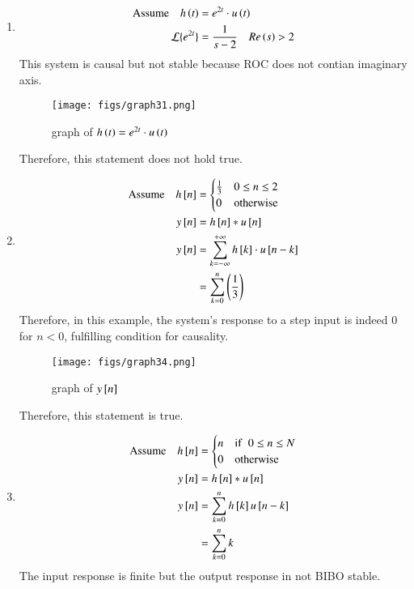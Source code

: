 \documentclass[journal,12pt,twocolumn]{IEEEtran}
\theoremstyle{remark}
\begin{document}
\begin{enumerate}
    \item
    \begin{align}
        \text{Assume}\quad h\left(t\right)&=e^{2t}\cdot u\left(t\right)\\
        \mathcal{L}\{e^{2t}\} &= \frac{1}{s-2}\quad Re\left(s\right)>2
    \end{align}
    This system is causal but not stable because ROC does not contian imaginary axis.
    
    \begin{figure}[ht]
    \renewcommand\thefigure{1}
        \centering
        \texttt{[image: figs/graph31.png]}
        \caption{graph of $h\left(t\right) = e^{2t}\cdot u\left(t\right)$}
    \end{figure}
    Therefore, this statement does not hold true.
    \item
    \begin{align}
        \text{Assume}\quad h{}\left[n\right] &= \begin{cases} 
                \frac{1}{3} & 0\leq n \leq 2 \\
                0 & \text{otherwise}
        \end{cases}\\
        y{}\left[n\right]&=h{}\left[n\right]*u{}\left[n\right]\\
        y{}\left[n\right]&=\sum_{k=-\infty}^{+\infty}h{}\left[k\right]\cdot u{}\left[n-k\right]\\
        &=\sum_{k=0}^{n}\left(\frac{1}{3}\right)
    \end{align}
    Therefore, in this example, the system's response to a step input is indeed $0$ for $n<0$, fulfilling condition for causality.\\
    \begin{figure}[h!]
    \renewcommand\thefigure{2}
        \centering
        \texttt{[image: figs/graph34.png]}
        \caption{graph of $y{}\left[n\right]$}
    \end{figure}
    Therefore, this statement is true.
    \item
    \begin{align}
            \text{Assume}\quad h{}\left[n\right] &= \begin{cases} 
                n & \text{if}\hspace{2mm}0 \leq n\leq N\\
                0 & \text{otherwise} \\
        \end{cases}\\
        y{}\left[n\right]&=h{}\left[n\right]*u{}\left[n\right]\\
        y{}\left[n\right] &= \sum_{k=0}^nh{}\left[k\right]u{}\left[n-k\right]\\
        &=\sum_{k=0}^nk
    \end{align}
    The input response is finite but the output response in not BIBO stable.
    

\end{enumerate}
\end{document}
